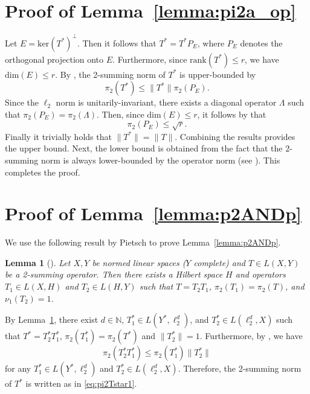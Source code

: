 \documentclass[11pt]{article}
\newtheorem{lemma}{Lemma}[section]
\begin{document}
\section{Proof of Lemma~\ref{lemma:pi2a_op}}
\label{sec:proof:lemma:pi2a_op}
Let $E = \mathrm{ker}(T^*)^\perp$. Then it follows that $T^* = T^* P_E$, where $P_E$ denotes the orthogonal projection onto $E$. Furthermore, since $\mathrm{rank}(T^*) \leq r$, we have $\mathrm{dim}(E) \leq r$. 
By \cite[Proposition~3.1]{jameson1987summing}, the 2-summing norm of $T^*$ is upper-bounded by
\[
\pi_2(T^*) \leq \|T^*\| \pi_2(P_E).
\]
Since the $\ell_2$ norm is unitarily-invariant, there exists a diagonal operator $\Lambda$ such that $\pi_2(P_E) = \pi_2(\Lambda)$. 
Then, since $\mathrm{dim}(E) \leq r$, it follows by \cite[Proposition~3.5]{jameson1987summing} that
\[
\pi_2(P_E) \leq \sqrt{r}.
\]
Finally it trivially holds that $\|T^*\| = \|T\|$. 
Combining the results provides the upper bound. 
Next, the lower bound is obtained from the fact that the 2-summing norm is always lower-bounded by the operator norm (see \cite[Proposition~3.1]{jameson1987summing}). 
This completes the proof.


\section{Proof of Lemma~\ref{lemma:p2ANDp}}
\label{sec:proof:lemma:p2ANDp}
We use the following result by Pietsch to prove Lemma~\ref{lemma:p2ANDp}.

\begin{lemma}[{\cite[Theorem~5.8]{jameson1987summing}}]
\label{lemma:pietsch}
Let $X,Y$ be normed linear spaces ($Y$ complete) and $T \in L(X,Y)$ be a 2-summing operator. Then there exists a Hilbert space $H$ and operators $T_1 \in L(X,H)$ and $T_2 \in L(H,Y)$ such that $T = T_2 T_1$, $\pi_2(T_1) = \pi_2(T)$, and $\nu_1(T_2) = 1$.
\end{lemma}

By Lemma~\ref{lemma:pietsch}, there exist $d \in \mathbb{N}$, $T_1^* \in L(Y^*,\ell_2^d)$, and $T_2^* \in L(\ell_2^d,X)$ such that $T^* = T_2^* T_1^*$, $\pi_2(T_1^*) = \pi_2(T^*)$ and $\|T_2^*\| = 1$. Furthermore, by \cite[Proposition~3.1]{jameson1987summing}, we have
\[
\pi_2(T_2^* T_1^*) \leq \pi_2(T_1^*) \|T_2^*\|
\]
for any $T_1^* \in L(Y^*,\ell_2^d)$ and $T_2^* \in L(\ell_2^d,X)$. Therefore, the 2-summing norm of $T^*$ is written as in \eqref{eq:pi2Tstar1}.
\end{document}

